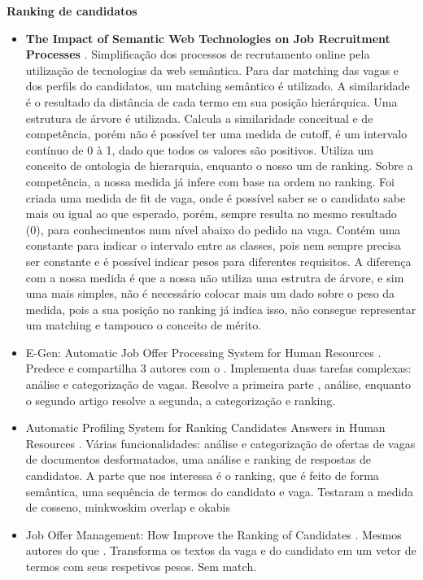 \documentclass[preprint,12pt]{elsarticle}
\begin{document}
\textbf{Ranking de candidatos}
\begin{itemize}

  \item \textbf{The Impact of Semantic Web Technologies on Job Recruitment Processes} \cite{impact-semantic-web-2005}. Simplificação dos processos de recrutamento online pela utilização de tecnologias da web semântica. Para dar matching das vagas e dos perfils do candidatos, um matching semântico é utilizado. A similaridade é o resultado da distância de cada termo em sua posição hierárquica. Uma estrutura de árvore é utilizada. Calcula a similaridade conceitual e de competência, porém não é possível ter uma medida de cutoff, é um intervalo contínuo de 0 à 1, dado que todos os valores são positivos. Utiliza um conceito de ontologia de hierarquia, enquanto o nosso um de ranking. Sobre a competência, a nossa medida já infere com base na ordem no ranking.
  Foi criada uma medida de fit de vaga, onde é possível saber se o candidato sabe mais ou igual ao que esperado, porém, sempre resulta no mesmo resultado (0), para conhecimentos num nível abaixo do pedido na vaga. Contém uma constante para indicar o intervalo entre as classes, pois nem sempre precisa ser constante e é possível indicar pesos para diferentes requisitos. A diferença com a nossa medida é que a nossa não utiliza uma estrutra de árvore, e sim uma mais simples, não é necessário colocar mais um dado sobre o peso da medida, pois a sua posição no ranking já indica isso, não consegue representar um matching e tampouco o conceito de mérito.
  
  \item E-Gen: Automatic Job Offer Processing System for Human Resources \cite{e-gen-job-processing-2007}. Predece e compartilha 3 autores com o \cite{automatic-profiling-2008}. Implementa duas tarefas complexas: análise e categorização de vagas. Resolve a primeira parte , análise, enquanto o segundo artigo resolve a segunda, a categorização e ranking.

  \item Automatic Profiling System for Ranking Candidates Answers in Human Resources \cite{automatic-profiling-2008}. Várias funcionalidades: análise e categorização de ofertas de vagas de documentos desformatados, uma análise e ranking de respostas de candidatos. A parte que nos interessa é o ranking, que é feito de forma semântica, uma sequência de termos do candidato e vaga. Testaram a medida de cosseno, minkwoskim overlap e okabis
  
  \item Job Offer Management: How Improve the Ranking of Candidates \cite{improve-ranking-candidates-2009}. Mesmos autores do que \cite{automatic-profiling-2008, e-gen-job-processing-2007}. Transforma os textos da vaga e do candidato em um vetor de termos com seus respetivos pesos. Sem match.
\end{itemize}
\end{document}
